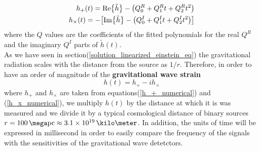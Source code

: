 \begin{eqnarray}
\label{h_+_numerical}
h_{+} (t)= \Re {\tilde{h}} -  \qty(Q_0 ^{R} + Q_1 ^{R} t + Q_2 ^{R} t^{2}) \\
\label{h_x_numerical}
h_{\times}(t) = - \qty[
\Im {\tilde{h}} -
\qty(Q_0 ^{I} + Q_1 ^{I} t + Q_2 ^{I} t^{2})
]
\end{eqnarray}
where the $Q$ values are the coefficients of the fitted polynomials for the real $Q^{R}$ and the imaginary $Q^{I}$ parts of $\tilde{h}(t)$.\\
As we have seen in section(\ref{solution_linearized_einstein_eq}) the gravitational radiation scales with the distance from the source as $1/r$.
Therefore, in order to have an order of magnitude of the \textbf{gravitational wave strain} 
\begin{equation}
\label{gravitational_wave_strain}
h(t) = h_{+} - i h_{\times}
\end{equation} 
where $h_{+}$ and $h_{\times}$ are taken from equations(\ref{h_+_numerical}) and (\ref{h_x_numerical}), we multiply $h(t)$ by the distance at which it is was measured and we divide it by a typical cosmological distance of binary sources $r=100 \, \mega \text{pc} \approx 3.1 \times 10^{19} \, \kilo \meter$.
In addition, the units of time will be expressed in millisecond in order to easily compare the frequency of the signals with the sensitivities of the gravitational wave detetctors.\\

